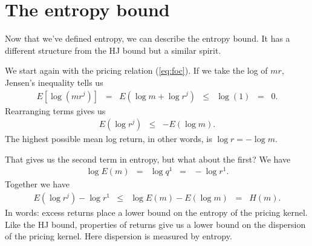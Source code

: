 \documentclass[11pt]{article}
\begin{document}
\section{The entropy bound}

Now that we've defined entropy, we can describe the entropy bound.
It has a different structure from the HJ bound but a similar spirit.

We start again with the pricing relation (\ref{eq:foc}).
If we take the log of $mr$, Jensen's inequality tells us
\begin{eqnarray*}
    E \left[ \log ( m r^j )\right]
        \;\;=\;\; E \left( \log m + \log r^j \right)
        &\leq& \log (1) \;\;=\;\; 0 .
\end{eqnarray*}
Rearranging terms gives us
\begin{eqnarray*}
    E (\log r^j)  &\leq& - E (\log m ). %
\end{eqnarray*}
The highest possible mean log return, in other words, is $\log r = - \log m$.


That gives us the second term in entropy, but what about the first?
We have
\begin{eqnarray*}
     \log E (m)  &=& \log q^1 \;\;=\;\; - \log r^1 .
\end{eqnarray*}
Together we have
\begin{eqnarray}
    E  (\log r^j) - \log r^1  &\leq& \log E(m) - E (\log m)  \;\;=\;\; H(m) .
    \label{eq:entropy-bound}
\end{eqnarray}
In words: excess returns place a lower bound on the entropy
of the pricing kernel.
Like the HJ bound, properties of returns give us a lower bound
on the dispersion of the pricing kernel.
Here dispersion is measured by entropy.
\end{document}
